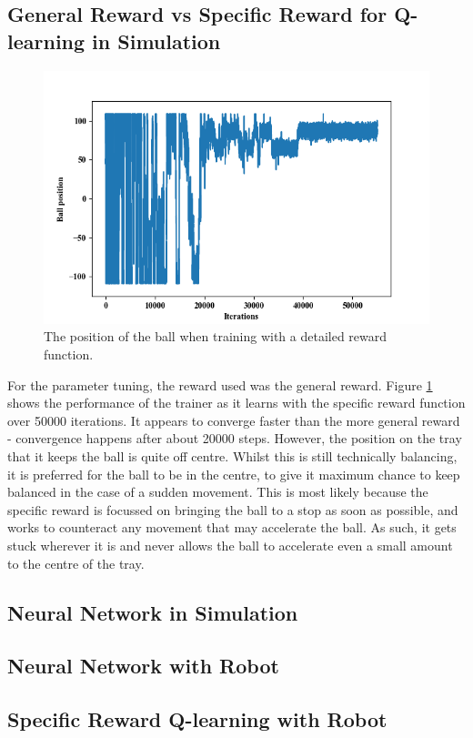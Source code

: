 \documentclass[12pt,a4paper]{article}
\begin{document}
\subsection{General Reward vs Specific Reward for Q-learning in Simulation}
\begin{figure}[H]
	\includegraphics{157}
	\caption{The position of the ball when training with a detailed reward function.}
	\label{f5}
\end{figure}
For the parameter tuning, the reward used was the general reward. Figure \ref{f5} shows the performance of the trainer as it learns with the specific reward function over 50000 iterations. It appears to converge faster than the more general reward - convergence happens after about 20000 steps. However, the position on the tray that it keeps the ball is quite off centre. Whilst this is still technically balancing, it is preferred for the ball to be in the centre, to give it maximum chance to keep balanced in the case of a sudden movement. This is most likely because the specific reward is focussed on bringing the ball to a stop as soon as possible, and works to counteract any movement that may accelerate the ball. As such, it gets stuck wherever it is and never allows the ball to accelerate even a small amount to the centre of the tray.

\subsection{Neural Network in Simulation}
\subsection{Neural Network with Robot}
\subsection{Specific Reward Q-learning with Robot}
\end{document}

